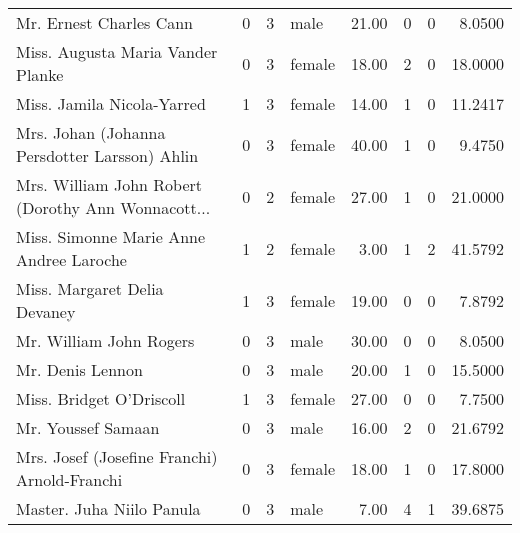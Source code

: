 \begin{tabular}{lrrlrrrr}
Mr. Ernest Charles Cann                            &         0 &       3 &    male &  21.00 &                        0 &                        0 &    8.0500 \\
Miss. Augusta Maria Vander Planke                  &         0 &       3 &  female &  18.00 &                        2 &                        0 &   18.0000 \\
Miss. Jamila Nicola-Yarred                         &         1 &       3 &  female &  14.00 &                        1 &                        0 &   11.2417 \\
Mrs. Johan (Johanna Persdotter Larsson) Ahlin      &         0 &       3 &  female &  40.00 &                        1 &                        0 &    9.4750 \\
Mrs. William John Robert (Dorothy Ann Wonnacott... &         0 &       2 &  female &  27.00 &                        1 &                        0 &   21.0000 \\
Miss. Simonne Marie Anne Andree Laroche            &         1 &       2 &  female &   3.00 &                        1 &                        2 &   41.5792 \\
Miss. Margaret Delia Devaney                       &         1 &       3 &  female &  19.00 &                        0 &                        0 &    7.8792 \\
Mr. William John Rogers                            &         0 &       3 &    male &  30.00 &                        0 &                        0 &    8.0500 \\
Mr. Denis Lennon                                   &         0 &       3 &    male &  20.00 &                        1 &                        0 &   15.5000 \\
Miss. Bridget O'Driscoll                           &         1 &       3 &  female &  27.00 &                        0 &                        0 &    7.7500 \\
Mr. Youssef Samaan                                 &         0 &       3 &    male &  16.00 &                        2 &                        0 &   21.6792 \\
Mrs. Josef (Josefine Franchi) Arnold-Franchi       &         0 &       3 &  female &  18.00 &                        1 &                        0 &   17.8000 \\
Master. Juha Niilo Panula                          &         0 &       3 &    male &   7.00 &                        4 &                        1 &   39.6875 \\

\end{tabular}
